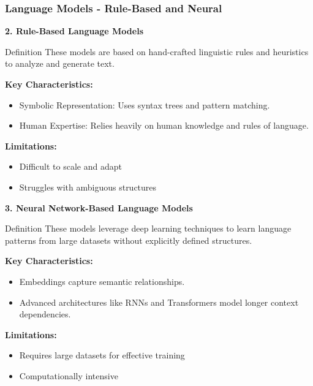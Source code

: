 \documentclass[aspectratio=169]{beamer}
\begin{document}
\begin{frame}[fragile]
    \frametitle{Language Models - Rule-Based and Neural}
    \textbf{2. Rule-Based Language Models}
    
    \begin{block}{Definition}
        These models are based on hand-crafted linguistic rules and heuristics to analyze and generate text.
    \end{block}
    
    \textbf{Key Characteristics:}
    \begin{itemize}
        \item Symbolic Representation: Uses syntax trees and pattern matching.
        \item Human Expertise: Relies heavily on human knowledge and rules of language.
    \end{itemize}
    
    \textbf{Limitations:}
    \begin{itemize}
        \item Difficult to scale and adapt
        \item Struggles with ambiguous structures
    \end{itemize}
    
    \textbf{3. Neural Network-Based Language Models}
    
    \begin{block}{Definition}
        These models leverage deep learning techniques to learn language patterns from large datasets without explicitly defined structures.
    \end{block}
    
    \textbf{Key Characteristics:}
    \begin{itemize}
        \item Embeddings capture semantic relationships.
        \item Advanced architectures like RNNs and Transformers model longer context dependencies.
    \end{itemize}
    
    \textbf{Limitations:}
    \begin{itemize}
        \item Requires large datasets for effective training
        \item Computationally intensive
    \end{itemize}
\end{frame}
\end{document}
